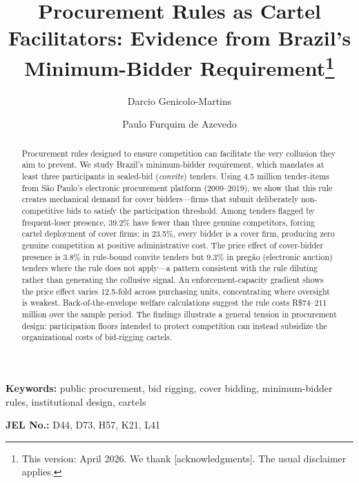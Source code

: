 \begin{frontmatter}

\title{Procurement Rules as Cartel Facilitators: Evidence from Brazil's Minimum-Bidder Requirement\texorpdfstring{\footnote{This version: April 2026. We thank [acknowledgments]. The usual disclaimer applies.}}{}}

\author[insper]{Darcio Genicolo-Martins}
\author[insper]{Paulo Furquim de Azevedo}

\begin{abstract}
Procurement rules designed to ensure competition can facilitate the
very collusion they aim to prevent. We study Brazil's minimum-bidder
requirement, which mandates at least three participants in sealed-bid
(\emph{convite}) tenders. Using 4.5 million tender-items from S\~ao
Paulo's electronic procurement platform (2009--2019), we show that
this rule creates mechanical demand for cover bidders---firms that
submit deliberately non-competitive bids to satisfy the participation
threshold. Among tenders flagged by frequent-loser presence, 39.2\%
have fewer than three genuine competitors, forcing cartel deployment
of cover firms; in 23.5\%, every bidder is a cover firm, producing
zero genuine competition at positive administrative cost. The price
effect of cover-bidder presence is 3.8\% in rule-bound convite
tenders but 9.3\% in preg\~ao (electronic auction) tenders where the
rule does not apply---a pattern consistent with the rule diluting
rather than generating the collusive signal. An enforcement-capacity
gradient shows the price effect varies 12.5-fold across purchasing
units, concentrating where oversight is weakest. Back-of-the-envelope
welfare calculations suggest the rule costs R\$74--211 million over
the sample period. The findings illustrate a general tension in
procurement design: participation floors intended to protect
competition can instead subsidize the organizational costs of
bid-rigging cartels.
\end{abstract}

\end{frontmatter}

\noindent\textbf{Keywords:} public procurement, bid rigging, cover bidding, minimum-bidder rules, institutional design, cartels

\noindent\textbf{JEL No.:} D44, D73, H57, K21, L41

\bigskip
